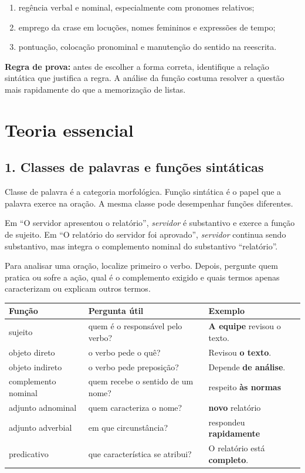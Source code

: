 \documentclass[11pt,a4paper]{article}
\begin{document}
\begin{enumerate}
  \item regência verbal e nominal, especialmente com pronomes relativos;
  \item emprego da crase em locuções, nomes femininos e expressões de tempo;
  \item pontuação, colocação pronominal e manutenção do sentido na reescrita.
\end{enumerate}

\textbf{Regra de prova:} antes de escolher a forma correta, identifique a relação sintática que justifica a regra. A análise da função costuma resolver a questão mais rapidamente do que a memorização de listas.

\section*{Teoria essencial}

\subsection*{1. Classes de palavras e funções sintáticas}

Classe de palavra é a categoria morfológica. Função sintática é o papel que a palavra exerce na oração. A mesma classe pode desempenhar funções diferentes.

Em “O servidor apresentou o relatório”, \textit{servidor} é substantivo e exerce a função de sujeito. Em “O relatório do servidor foi aprovado”, \textit{servidor} continua sendo substantivo, mas integra o complemento nominal do substantivo “relatório”.

Para analisar uma oração, localize primeiro o verbo. Depois, pergunte quem pratica ou sofre a ação, qual é o complemento exigido e quais termos apenas caracterizam ou explicam outros termos.

\begin{tabularx}{\linewidth}{llX}
\toprule
 \textbf{Função} & \textbf{Pergunta útil} & \textbf{Exemplo} \\
\midrule
 sujeito & quem é o responsável pelo verbo? & \textbf{A equipe} revisou o texto. \\
 objeto direto & o verbo pede o quê? & Revisou \textbf{o texto}. \\
 objeto indireto & o verbo pede preposição? & Depende \textbf{de análise}. \\
 complemento nominal & quem recebe o sentido de um nome? & respeito \textbf{às normas} \\
 adjunto adnominal & quem caracteriza o nome? & \textbf{novo} relatório \\
 adjunto adverbial & em que circunstância? & respondeu \textbf{rapidamente} \\
 predicativo & que característica se atribui? & O relatório está \textbf{completo}. \\
\bottomrule
\end{tabularx}
\end{document}
